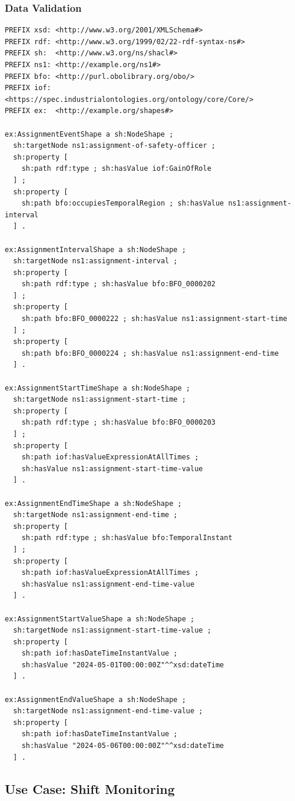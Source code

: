 \subsubsection*{Data Validation}

\begin{verbatim}
PREFIX xsd: <http://www.w3.org/2001/XMLSchema#>
PREFIX rdf: <http://www.w3.org/1999/02/22-rdf-syntax-ns#>
PREFIX sh:  <http://www.w3.org/ns/shacl#>
PREFIX ns1: <http://example.org/ns1#>
PREFIX bfo: <http://purl.obolibrary.org/obo/> 
PREFIX iof: <https://spec.industrialontologies.org/ontology/core/Core/>
PREFIX ex:  <http://example.org/shapes#>

ex:AssignmentEventShape a sh:NodeShape ;
  sh:targetNode ns1:assignment-of-safety-officer ;
  sh:property [
    sh:path rdf:type ; sh:hasValue iof:GainOfRole
  ] ;
  sh:property [
    sh:path bfo:occupiesTemporalRegion ; sh:hasValue ns1:assignment-interval
  ] .

ex:AssignmentIntervalShape a sh:NodeShape ;
  sh:targetNode ns1:assignment-interval ;
  sh:property [
    sh:path rdf:type ; sh:hasValue bfo:BFO_0000202
  ] ;
  sh:property [
    sh:path bfo:BFO_0000222 ; sh:hasValue ns1:assignment-start-time
  ] ;
  sh:property [
    sh:path bfo:BFO_0000224 ; sh:hasValue ns1:assignment-end-time
  ] .

ex:AssignmentStartTimeShape a sh:NodeShape ;
  sh:targetNode ns1:assignment-start-time ;
  sh:property [
    sh:path rdf:type ; sh:hasValue bfo:BFO_0000203
  ] ;
  sh:property [
    sh:path iof:hasValueExpressionAtAllTimes ;
    sh:hasValue ns1:assignment-start-time-value
  ] .

ex:AssignmentEndTimeShape a sh:NodeShape ;
  sh:targetNode ns1:assignment-end-time ;
  sh:property [
    sh:path rdf:type ; sh:hasValue bfo:TemporalInstant
  ] ;
  sh:property [
    sh:path iof:hasValueExpressionAtAllTimes ;
    sh:hasValue ns1:assignment-end-time-value
  ] .

ex:AssignmentStartValueShape a sh:NodeShape ;
  sh:targetNode ns1:assignment-start-time-value ;
  sh:property [
    sh:path iof:hasDateTimeInstantValue ;
    sh:hasValue "2024-05-01T00:00:00Z"^^xsd:dateTime
  ] .

ex:AssignmentEndValueShape a sh:NodeShape ;
  sh:targetNode ns1:assignment-end-time-value ;
  sh:property [
    sh:path iof:hasDateTimeInstantValue ;
    sh:hasValue "2024-05-06T00:00:00Z"^^xsd:dateTime
  ] .
\end{verbatim}

\subsection*{Use Case: Shift Monitoring}


